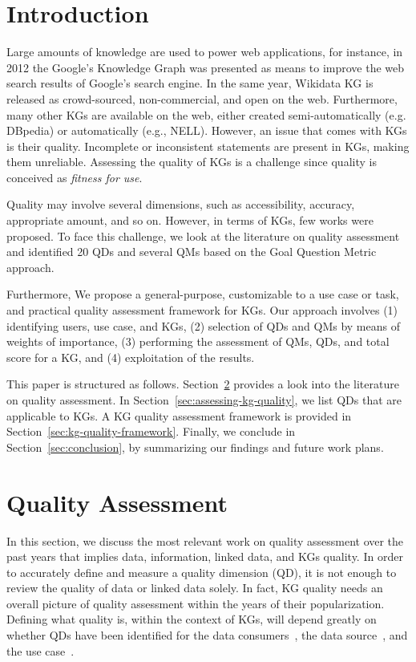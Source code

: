 \documentclass[runningheads]{llncs}
\begin{document}
\section{Introduction}
\label{sec:introduction}
%
Large amounts of knowledge are used to power web applications, for instance, in 2012 the Google's Knowledge Graph was presented as means to improve the web search results of Google's search engine. In the same year, Wikidata KG is released as crowd-sourced, non-commercial, and open on the web. Furthermore, many other KGs are available on the web, either created semi-automatically (e.g. DBpedia) or automatically (e.g., NELL). However, an issue that comes with KGs is their quality. Incomplete or inconsistent statements are present in KGs, making them unreliable. Assessing the quality of KGs is a challenge since quality is conceived as \textit{fitness for use}.

Quality may involve several dimensions, such as accessibility, accuracy, appropriate amount, and so on. However, in terms of KGs, few works were proposed. To face this challenge, we look at the literature on quality assessment and identified 20 QDs and several QMs based on the Goal Question Metric approach. 

Furthermore, We propose a general-purpose, customizable to a use case or task, and practical quality assessment framework for KGs. Our approach involves (1) identifying users, use case, and KGs, (2) selection of QDs and QMs by means of weights of importance, (3) performing the assessment of QMs, QDs, and total score for a KG, and (4) exploitation of the results.

This paper is structured as follows. Section~\ref{sec:quality-assessment} provides a look into the literature on quality assessment. In Section~\ref{sec:assessing-kg-quality}, we list QDs that are applicable to KGs. A KG quality assessment framework is provided in Section~\ref{sec:kg-quality-framework}. Finally, we conclude in Section~\ref{sec:conclusion}, by summarizing our findings and future work plans.
% 
\section{Quality Assessment}
\label{sec:quality-assessment}
%
In this section, we discuss the most relevant work on quality assessment over the past years that implies data, information, linked data, and KGs quality. In order to accurately define and measure a quality dimension (QD), it is not enough to review the quality of data or linked data solely. In fact, KG quality needs an overall picture of quality assessment within the years of their popularization. Defining what quality is, within the context of KGs, will depend greatly on whether QDs have been identified for the data consumers~\cite{WangS96}, the data source~\cite{bizer2007,NaumannR00}, and the use case~\cite{FarberBMR18,FenselSAHKPTUW20,ZaveriRMPLA16}.
\end{document}
